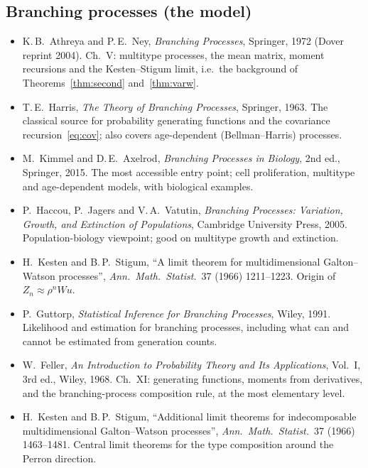 \documentclass[11pt]{article}
\theoremstyle{definition}
\theoremstyle{remark}
\begin{document}
\subsection*{Branching processes (the model)}
\begin{itemize}
\item[B1$^\star$] K.\,B.\ Athreya and P.\,E.\ Ney, \emph{Branching Processes}, Springer, 1972 (Dover reprint 2004). Ch.~V: multitype processes, the mean matrix, moment recursions and the Kesten--Stigum limit, i.e.\ the background of Theorems~\ref{thm:second} and~\ref{thm:varw}.
\item[B2] T.\,E.\ Harris, \emph{The Theory of Branching Processes}, Springer, 1963. The classical source for probability generating functions and the covariance recursion~\eqref{eq:cov}; also covers age-dependent (Bellman--Harris) processes.
\item[B3$^\star$] M.\ Kimmel and D.\,E.\ Axelrod, \emph{Branching Processes in Biology}, 2nd ed., Springer, 2015. The most accessible entry point; cell proliferation, multitype and age-dependent models, with biological examples.
\item[B4] P.\ Haccou, P.\ Jagers and V.\,A.\ Vatutin, \emph{Branching Processes: Variation, Growth, and Extinction of Populations}, Cambridge University Press, 2005. Population-biology viewpoint; good on multitype growth and extinction.
\item[B5] H.\ Kesten and B.\,P.\ Stigum, ``A limit theorem for multidimensional Galton--Watson processes'', \emph{Ann.\ Math.\ Statist.}\ 37 (1966) 1211--1223. Origin of $Z_n\approx\rho^nWu$.
\item[B6] P.\ Guttorp, \emph{Statistical Inference for Branching Processes}, Wiley, 1991. Likelihood and estimation for branching processes, including what can and cannot be estimated from generation counts.
\item[B7$^\star$] W.\ Feller, \emph{An Introduction to Probability Theory and Its Applications}, Vol.~I, 3rd ed., Wiley, 1968. Ch.~XI: generating functions, moments from derivatives, and the branching-process composition rule, at the most elementary level.
\item[B8] H.\ Kesten and B.\,P.\ Stigum, ``Additional limit theorems for indecomposable multidimensional Galton--Watson processes'', \emph{Ann.\ Math.\ Statist.}\ 37 (1966) 1463--1481. Central limit theorems for the type composition around the Perron direction.
\end{itemize}
\end{document}
